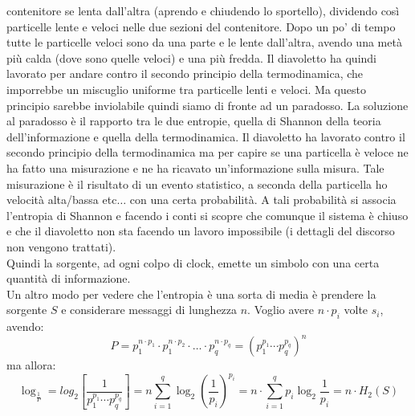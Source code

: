 \documentclass[a4paper,12pt, oneside]{book}
\begin{document}
contenitore se lenta dall'altra (aprendo e chiudendo lo sportello), dividendo
così particelle lente e veloci nelle due sezioni del contenitore. Dopo un po' di
tempo tutte le particelle veloci sono da una parte e le lente dall'altra, avendo
una metà più calda (dove sono quelle veloci) e una più fredda. Il diavoletto ha
quindi lavorato per andare contro il secondo principio della termodinamica, che
imporrebbe un miscuglio uniforme tra particelle lenti e veloci. Ma questo
principio sarebbe inviolabile quindi siamo di fronte ad un paradosso. La
soluzione al paradosso è il rapporto tra le due entropie, quella di Shannon
della teoria dell'informazione e quella della termodinamica. Il diavoletto
ha lavorato contro il secondo principio della termodinamica ma per capire se una
particella è veloce ne ha fatto una misurazione e ne ha ricavato un'informazione
sulla misura. Tale misurazione è il risultato di un evento statistico, a seconda
della particella ho velocità alta/bassa etc$\ldots$ con una certa probabilità. A
tali probabilità si associa l'entropia di Shannon e facendo i conti si scopre
che comunque il sistema è chiuso e che il diavoletto non sta facendo un lavoro
impossibile (i dettagli del discorso non vengono trattati).\\
Quindi la sorgente, ad ogni colpo di clock, emette un simbolo con una certa
quantità di informazione. \\
Un altro modo per vedere che l'entropia è una sorta di media è prendere la
sorgente $S$ e considerare messaggi di lunghezza $n$. Voglio avere $n\cdot p_i$
volte $s_i$, avendo: 
\[P=p_1^{n\cdot p_1}\cdot p_1^{n\cdot p_2}\cdot \ldots \cdot p_q^{n\cdot
    p_q}=(p_1^{p_1}\cdots p_q^{p_q})^n\]
ma allora:
\[\log_\frac{1}{P}=log_2\left[\frac{1}{p_1^{p_1}\cdots
      p_q^{p_q}}\right]=n\sum_{i=1}^q\log_2\left(\frac{1}{p_i}\right)^{p_i}=n\cdot
  \sum_{i=1}^qp_i\log_2\frac{1}{p_i}=n\cdot H_2(S)\]
\end{document}
